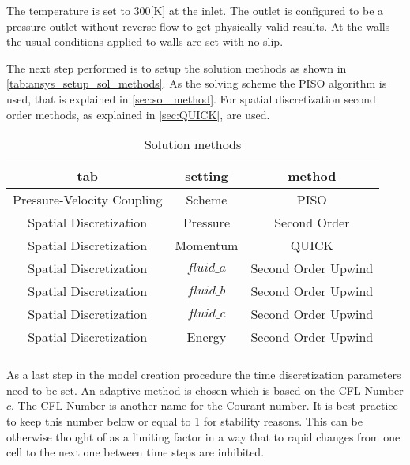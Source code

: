 \documentclass[../thesis.tex]{subfiles}
\begin{document}
The temperature is set to 300[K] at the inlet. The outlet is configured to be a pressure outlet without reverse flow to get physically valid results. At the walls the usual conditions applied to walls are set with no slip.

The next step performed is to setup the solution methods as shown in \autoref{tab:ansys_setup_sol_methods}. As the solving scheme the PISO algorithm is used, that is explained in \autoref{sec:sol_method}. For spatial discretization second order methods, as explained in \autoref{sec:QUICK}, are used. 
\begin{table} [htb]
	\centering
	\caption{Solution methods}
	\begin{tabular}{ ccc }
		\hline
		tab & setting & method \\
		\hline
		Pressure-Velocity Coupling & Scheme & PISO \\
		Spatial Discretization & Pressure & Second Order \\
		Spatial Discretization & Momentum & QUICK \\
		Spatial Discretization & $fluid\_a$ & Second Order Upwind \\
		Spatial Discretization & $fluid\_b$ & Second Order Upwind \\
		Spatial Discretization & $fluid\_c$ & Second Order Upwind \\
		Spatial Discretization & Energy & Second Order Upwind \\
		\hline		
		\label{tab:ansys_setup_sol_methods}
	\end{tabular}
\end{table}

As a last step in the model creation procedure the time discretization parameters need to be set. An adaptive method is chosen which is based on the CFL-Number $c$. The CFL-Number is another name for the Courant number. It is best practice to keep this number below or equal to 1 for stability reasons. This can be otherwise thought of as a limiting factor in a way that to rapid changes from one cell to the next one between time steps are inhibited.
  
\end{document}
